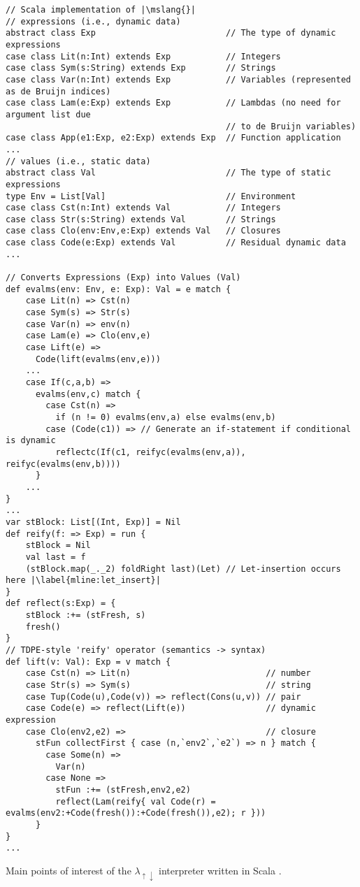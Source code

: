 \documentclass[a4paper,12pt,twoside,openright]{report}
\theoremstyle{definition}
\newcommand{\mslang}{$\lambda_{\uparrow\downarrow}$}
\newenvironment{longlisting}{\captionsetup{type=listing}}{}
\begin{document}
\newpage
\begin{longlisting}
    \centering
    \begin{verbatim}
// Scala implementation of |\mslang{}|
// expressions (i.e., dynamic data)
abstract class Exp                          // The type of dynamic expressions
case class Lit(n:Int) extends Exp           // Integers
case class Sym(s:String) extends Exp        // Strings
case class Var(n:Int) extends Exp           // Variables (represented as de Bruijn indices)
case class Lam(e:Exp) extends Exp           // Lambdas (no need for argument list due
                                            // to de Bruijn variables)
case class App(e1:Exp, e2:Exp) extends Exp  // Function application
...
// values (i.e., static data)
abstract class Val                          // The type of static expressions
type Env = List[Val]                        // Environment
case class Cst(n:Int) extends Val           // Integers
case class Str(s:String) extends Val        // Strings
case class Clo(env:Env,e:Exp) extends Val   // Closures
case class Code(e:Exp) extends Val          // Residual dynamic data
...

// Converts Expressions (Exp) into Values (Val)
def evalms(env: Env, e: Exp): Val = e match {
    case Lit(n) => Cst(n)
    case Sym(s) => Str(s)
    case Var(n) => env(n)
    case Lam(e) => Clo(env,e)
    case Lift(e) =>
      Code(lift(evalms(env,e)))
    ...
    case If(c,a,b) =>
      evalms(env,c) match {
        case Cst(n) => 
          if (n != 0) evalms(env,a) else evalms(env,b)
        case (Code(c1)) => // Generate an if-statement if conditional is dynamic
          reflectc(If(c1, reifyc(evalms(env,a)), reifyc(evalms(env,b))))
      }
    ...
}
...
var stBlock: List[(Int, Exp)] = Nil
def reify(f: => Exp) = run {
    stBlock = Nil
    val last = f
    (stBlock.map(_._2) foldRight last)(Let) // Let-insertion occurs here |\label{mline:let_insert}|
}
def reflect(s:Exp) = {
    stBlock :+= (stFresh, s)
    fresh()
}
// TDPE-style 'reify' operator (semantics -> syntax)
def lift(v: Val): Exp = v match {
    case Cst(n) => Lit(n)                           // number
    case Str(s) => Sym(s)                           // string
    case Tup(Code(u),Code(v)) => reflect(Cons(u,v)) // pair
    case Code(e) => reflect(Lift(e))                // dynamic expression
    case Clo(env2,e2) =>                            // closure
      stFun collectFirst { case (n,`env2`,`e2`) => n } match {
        case Some(n) =>
          Var(n)
        case None =>
          stFun :+= (stFresh,env2,e2)
          reflect(Lam(reify{ val Code(r) = evalms(env2:+Code(fresh()):+Code(fresh()),e2); r }))
      }
}
...
    \end{verbatim}
    \caption{Main points of interest of the \mslang{} interpreter written in Scala \cite{odersky2004overview}.}
    \label{lst:evalms}
\end{longlisting}
\newpage
\end{document}
